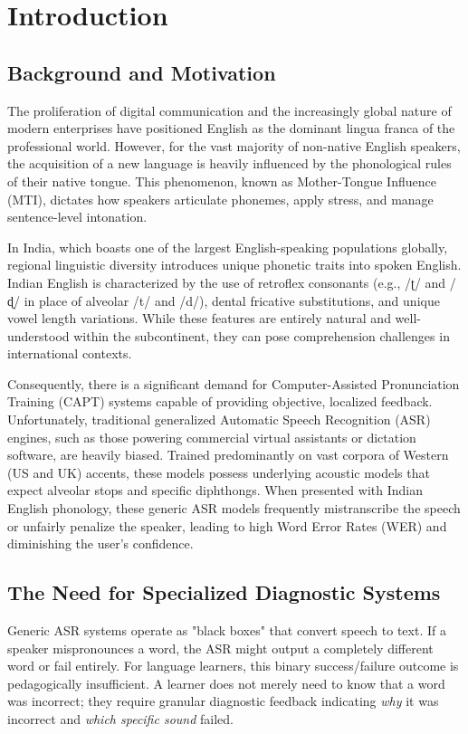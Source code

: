 \chapter{Introduction}

\section{Background and Motivation}
The proliferation of digital communication and the increasingly global nature of modern enterprises have positioned English as the dominant lingua franca of the professional world. However, for the vast majority of non-native English speakers, the acquisition of a new language is heavily influenced by the phonological rules of their native tongue. This phenomenon, known as Mother-Tongue Influence (MTI), dictates how speakers articulate phonemes, apply stress, and manage sentence-level intonation. 

In India, which boasts one of the largest English-speaking populations globally, regional linguistic diversity introduces unique phonetic traits into spoken English. Indian English is characterized by the use of retroflex consonants (e.g., /ʈ/ and /ɖ/ in place of alveolar /t/ and /d/), dental fricative substitutions, and unique vowel length variations. While these features are entirely natural and well-understood within the subcontinent, they can pose comprehension challenges in international contexts. 

Consequently, there is a significant demand for Computer-Assisted Pronunciation Training (CAPT) systems capable of providing objective, localized feedback. Unfortunately, traditional generalized Automatic Speech Recognition (ASR) engines, such as those powering commercial virtual assistants or dictation software, are heavily biased. Trained predominantly on vast corpora of Western (US and UK) accents, these models possess underlying acoustic models that expect alveolar stops and specific diphthongs. When presented with Indian English phonology, these generic ASR models frequently mistranscribe the speech or unfairly penalize the speaker, leading to high Word Error Rates (WER) and diminishing the user's confidence.

\section{The Need for Specialized Diagnostic Systems}
Generic ASR systems operate as "black boxes" that convert speech to text. If a speaker mispronounces a word, the ASR might output a completely different word or fail entirely. For language learners, this binary success/failure outcome is pedagogically insufficient. A learner does not merely need to know that a word was incorrect; they require granular diagnostic feedback indicating \textit{why} it was incorrect and \textit{which specific sound} failed.

